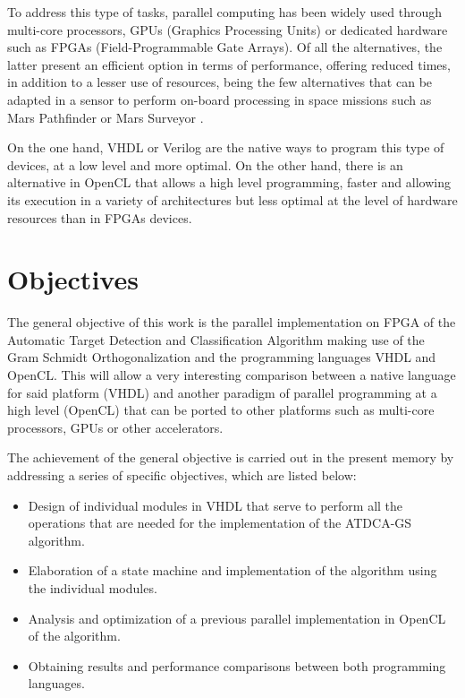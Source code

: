 To address this type of tasks, parallel computing has been widely used through multi-core processors, GPUs (Graphics Processing Units) or dedicated hardware such as FPGAs (Field-Programmable Gate Arrays). Of all the alternatives, the latter present an efficient option in terms of performance, offering reduced times, in addition to a lesser use of resources, being the few alternatives that can be adapted in a sensor to perform on-board processing in space missions such as Mars Pathfinder or Mars Surveyor \cite{TFG_Esquembri}.

On the one hand, VHDL or Verilog are the native ways to program this type of devices, at a low level and more optimal. On the other hand, there is an alternative in OpenCL that allows a high level programming, faster and allowing its execution in a variety of architectures but less optimal at the level of hardware resources than in FPGAs devices.

\section{Objectives}

The general objective of this work is the parallel implementation on FPGA of the Automatic Target Detection and Classification Algorithm \cite{ATDCA, 298007} making use of the Gram Schmidt Orthogonalization and the programming languages VHDL and OpenCL. This will allow a very interesting comparison between a native language for said platform (VHDL) and another paradigm of parallel programming at a high level (OpenCL) that can be ported to other platforms such as multi-core processors, GPUs or other accelerators.

The achievement of the general objective is carried out in the present memory by addressing a series of specific objectives, which are listed below:

\begin{itemize}
    \item Design of individual modules in VHDL that serve to perform all the operations that are needed for the implementation of the ATDCA-GS algorithm.
    \item Elaboration of a state machine and implementation of the algorithm using the individual modules.
    \item Analysis and optimization of a previous parallel implementation in OpenCL of the algorithm.
    \item Obtaining results and performance comparisons between both programming languages.
\end{itemize}

